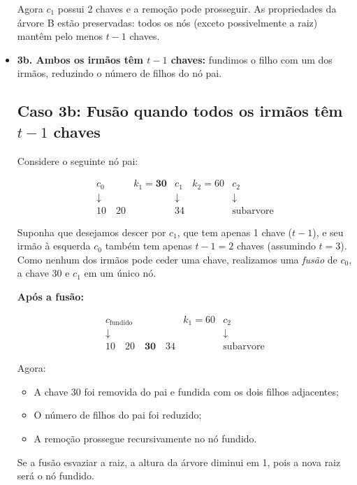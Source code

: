 \begin{itemize}
Agora \( c_1 \) possui 2 chaves e a remoção pode prosseguir. As propriedades da árvore B estão preservadas: todos os nós (exceto possivelmente a raiz) mantêm pelo menos \( t - 1 \) chaves.

  \item \textbf{3b. Ambos os irmãos têm \( t - 1 \) chaves:} fundimos o filho com um dos irmãos, reduzindo o número de filhos do nó pai.

  \subsection*{Caso 3b: Fusão quando todos os irmãos têm \( t - 1 \) chaves}

Considere o seguinte nó pai:

\[
\begin{array}{ccccccc}
  \boxed{c_0}      & k_1 = \mathbf{30} & \boxed{c_1}        & k_2 = 60 & \boxed{c_2} \\
  \downarrow       &          & \downarrow         &          & \downarrow  \\
  \boxed{10 \quad 20} &        & \boxed{34}         &          & \text{subarvore}
\end{array}
\]

Suponha que desejamos descer por \( c_1 \), que tem apenas 1 chave (\( t - 1 \)), e seu irmão à esquerda \( c_0 \) também tem apenas \( t - 1 = 2 \) chaves (assumindo \( t = 3 \)). 
Como nenhum dos irmãos pode ceder uma chave, realizamos uma {\em fusão} de \( c_0 \), a chave \( 30 \) e \( c_1 \) em um único nó.

\textbf{Após a fusão:}

\[
\begin{array}{cccccc}
  \boxed{c_{\text{fundido}}} & k_1 = 60 & \boxed{c_2} \\
  \downarrow & & \downarrow \\
  \boxed{10 \quad 20 \quad \mathbf{30} \quad 34} & & \text{subarvore}
\end{array}
\]

Agora:
\begin{itemize}
\item A chave \( 30 \) foi removida do pai e fundida com os dois filhos adjacentes;
\item O número de filhos do pai foi reduzido;
\item A remoção prossegue recursivamente no nó fundido.
\end{itemize}

Se a fusão esvaziar a raiz, a altura da árvore diminui em 1, pois a nova raiz será o nó fundido.

\end{itemize}

